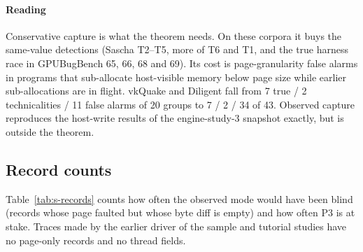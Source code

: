 \documentclass[acmtog,anonymous,review]{acmart}
\newcommand{\bench}{GPUBugBench\xspace}
\begin{document}
\paragraph{Reading}
Conservative capture is what the theorem needs. On these corpora it buys the same-value detections (Sascha T2--T5,
more of T6 and T1, and the true harness race in \bench 65, 66, 68 and 69). Its cost is page-granularity false alarms in
programs that sub-allocate host-visible memory below page size while earlier sub-allocations are in flight. vkQuake and
Diligent fall from 7 true / 2 technicalities / 11 false alarms of 20 groups to 7 / 2 / 34 of 43. Observed capture
reproduces the host-write results of the engine-study-3 snapshot exactly, but is outside the theorem.

\subsection{Record counts}
Table~\ref{tab:s-records} counts how often the observed mode would have been blind (records whose page faulted but
whose byte diff is empty) and how often P3 is at stake. Traces made by the earlier driver of the sample and tutorial
studies have no page-only records and no thread fields.

\begin{table}[htbp]
\caption{Host-write records, conservative mode, loaded by the first snapshot of the verified configuration. Driver:
the earlier driver of the sample and tutorial studies, or the current one.}
\label{tab:s-records}
\scriptsize
{}
\end{table}
\end{document}
